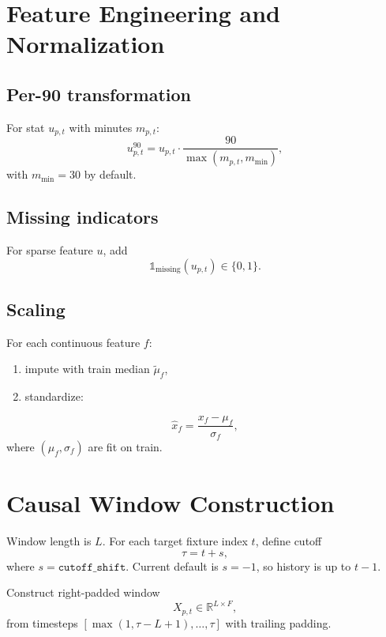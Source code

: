 \documentclass[11pt]{article}
\begin{document}
\section{Feature Engineering and Normalization}

\subsection{Per-90 transformation}
For stat $u_{p,t}$ with minutes $m_{p,t}$:
\begin{equation}
 u^{90}_{p,t} = u_{p,t}\cdot\frac{90}{\max(m_{p,t},m_{\min})},
\end{equation}
with $m_{\min}=30$ by default.

\subsection{Missing indicators}
For sparse feature $u$, add
\begin{equation}
 \mathbb{1}_{\text{missing}}(u_{p,t})\in\{0,1\}.
\end{equation}

\subsection{Scaling}
For each continuous feature $f$:
\begin{enumerate}[label=\arabic*)]
  \item impute with train median $\tilde\mu_f$,
  \item standardize:
\end{enumerate}
\begin{equation}
 \hat x_f = \frac{x_f-\mu_f}{\sigma_f},
\end{equation}
where $(\mu_f,\sigma_f)$ are fit on train.

\section{Causal Window Construction}

Window length is $L$. For each target fixture index $t$, define cutoff
\begin{equation}
 \tau = t + s,
\end{equation}
where $s=\texttt{cutoff\_shift}$. Current default is $s=-1$, so history is up to $t-1$.

Construct right-padded window
\begin{equation}
 X_{p,t}\in\mathbb{R}^{L\times F},
\end{equation}
from timesteps $[\max(1,\tau-L+1),\dots,\tau]$ with trailing padding.
\end{document}
